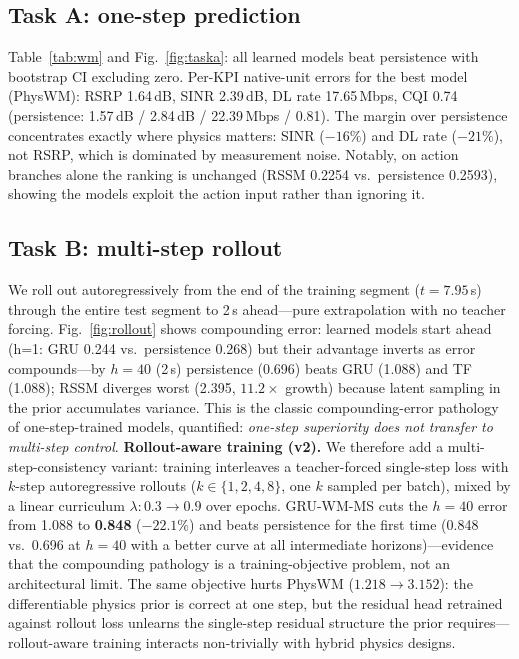 \documentclass[10pt,conference]{IEEEtran}
\begin{document}
\subsection{Task A: one-step prediction}
Table~\ref{tab:wm} and Fig.~\ref{fig:taska}: all learned models beat persistence with bootstrap CI excluding zero.
Per-KPI native-unit errors for the best model (PhysWM): RSRP 1.64\,dB, SINR 2.39\,dB, DL rate 17.65\,Mbps, CQI 0.74 (persistence: 1.57\,dB / 2.84\,dB / 22.39\,Mbps / 0.81).
The margin over persistence concentrates exactly where physics matters: SINR ($-16\%$) and DL rate ($-21\%$), not RSRP, which is dominated by measurement noise.
Notably, on action branches alone the ranking is unchanged (RSSM 0.2254 vs.\ persistence 0.2593), showing the models exploit the action input rather than ignoring it.

\subsection{Task B: multi-step rollout}
We roll out autoregressively from the end of the training segment ($t=7.95$\,s) through the entire test segment to 2\,s ahead---pure extrapolation with no teacher forcing.
Fig.~\ref{fig:rollout} shows compounding error: learned models start ahead (h=1: GRU 0.244 vs.\ persistence 0.268) but their advantage inverts as error compounds---by $h{=}40$ (2\,s) persistence (0.696) beats GRU (1.088) and TF (1.088); RSSM diverges worst (2.395, $11.2\times$ growth) because latent sampling in the prior accumulates variance.
This is the classic compounding-error pathology of one-step-trained models, quantified: \emph{one-step superiority does not transfer to multi-step control}.
\textbf{Rollout-aware training (v2).}
We therefore add a multi-step-consistency variant: training interleaves a teacher-forced single-step loss with $k$-step autoregressive rollouts ($k\in\{1,2,4,8\}$, one $k$ sampled per batch), mixed by a linear curriculum $\lambda{:}0.3\!\to\!0.9$ over epochs.
GRU-WM-MS cuts the $h{=}40$ error from 1.088 to \textbf{0.848} ($-22.1\%$) and beats persistence for the first time (0.848 vs.\ 0.696 at $h{=}40$ with a better curve at all intermediate horizons)---evidence that the compounding pathology is a training-objective problem, not an architectural limit.
The same objective hurts PhysWM ($1.218\!\to\!3.152$): the differentiable physics prior is correct at one step, but the residual head retrained against rollout loss unlearns the single-step residual structure the prior requires---rollout-aware training interacts non-trivially with hybrid physics designs.
\end{document}
